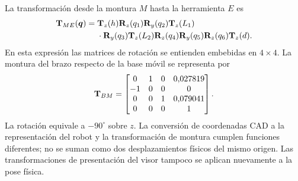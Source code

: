 La transformación desde la montura $M$ hasta la herramienta $E$ es
\begin{equation}
\begin{aligned}
\mathbf{T}_{ME}(\boldsymbol{q})={}&\mathbf{T}_z(h)\mathbf{R}_z(q_1)\mathbf{R}_y(q_2)\mathbf{T}_z(L_1)\\
&\cdot\mathbf{R}_y(q_3)\mathbf{T}_z(L_2)\mathbf{R}_z(q_4)\mathbf{R}_y(q_5)
\mathbf{R}_z(q_6)\mathbf{T}_z(d).
\end{aligned}
\label{eq:cadena}
\end{equation}
En esta expresión las matrices de rotación se entienden embebidas en $4\times4$. La montura del brazo respecto de la base móvil se representa por
\begin{equation}
\mathbf{T}_{BM}=\begin{bmatrix}
0&1&0&0{,}027819\\-1&0&0&0\\0&0&1&0{,}079041\\0&0&0&1
\end{bmatrix}.
\label{eq:montura}
\end{equation}
La rotación equivale a $-90^{\circ}$ sobre $z$. La conversión de coordenadas CAD a la representación del robot y la transformación de montura cumplen funciones diferentes; no se suman como dos desplazamientos físicos del mismo origen. Las transformaciones de presentación del visor tampoco se aplican nuevamente a la pose física.

